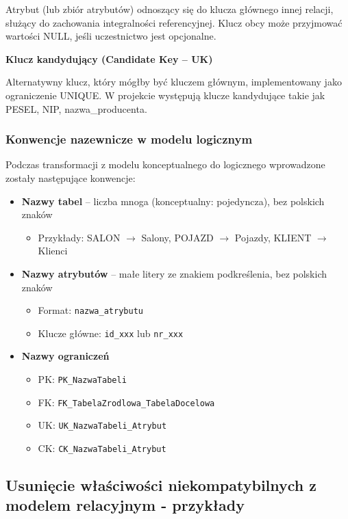 \documentclass[a4paper,titleauthor]{mwart}
\begin{document}
	Atrybut (lub zbiór atrybutów) odnoszący się do klucza głównego innej relacji, służący do zachowania integralności referencyjnej. Klucz obcy może przyjmować wartości NULL, jeśli uczestnictwo jest opcjonalne.

	\textbf{Klucz kandydujący (Candidate Key -- UK)}

	Alternatywny klucz, który mógłby być kluczem głównym, implementowany jako ograniczenie UNIQUE. W projekcie występują klucze kandydujące takie jak PESEL, NIP, nazwa\_producenta.

	\subsubsection{Konwencje nazewnicze w modelu logicznym}

	Podczas transformacji z modelu konceptualnego do logicznego wprowadzone zostały następujące konwencje:

	\begin{itemize}
		\item \textbf{Nazwy tabel} -- liczba mnoga (konceptualny: pojedyncza), bez polskich znaków
		\begin{itemize}
			\item Przykłady: SALON $\rightarrow$ Salony, POJAZD $\rightarrow$ Pojazdy, KLIENT $\rightarrow$ Klienci
		\end{itemize}
		\item \textbf{Nazwy atrybutów} -- małe litery ze znakiem podkreślenia, bez polskich znaków
		\begin{itemize}
			\item Format: \texttt{nazwa\_atrybutu}
			\item Klucze główne: \texttt{id\_xxx} lub \texttt{nr\_xxx}
		\end{itemize}
		\item \textbf{Nazwy ograniczeń}
		\begin{itemize}
			\item PK: \texttt{PK\_NazwaTabeli}
			\item FK: \texttt{FK\_TabelaZrodlowa\_TabelaDocelowa}
			\item UK: \texttt{UK\_NazwaTabeli\_Atrybut}
			\item CK: \texttt{CK\_NazwaTabeli\_Atrybut}
		\end{itemize}
	\end{itemize}

	\newpage
	\subsection{Usunięcie właściwości niekompatybilnych z modelem relacyjnym - przykłady}
\end{document}
